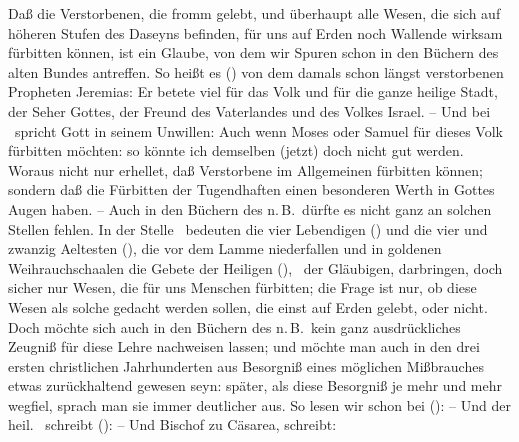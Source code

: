 \begin{aufza}
\item Daß die Verstorbenen, die fromm gelebt, und überhaupt alle Wesen, die sich auf höheren Stufen des Daseyns befinden, für uns auf Erden noch Wallende wirksam fürbitten können, ist ein Glaube, von dem wir Spuren schon in den Büchern des alten Bundes antreffen. So heißt es () von dem damals schon längst verstorbenen Propheten Jeremias: Er betete viel für das Volk und für die ganze heilige Stadt, der Seher Gottes, der Freund des Vaterlandes und des Volkes Israel. -- Und bei \ spricht Gott in seinem Unwillen: Auch wenn Moses oder Samuel für dieses Volk fürbitten möchten: so könnte ich demselben (jetzt) doch nicht gut werden. Woraus nicht nur erhellet, daß Verstorbene im Allgemeinen fürbitten können; sondern daß die Fürbitten der Tugendhaften einen besonderen Werth in Gottes Augen haben. -- Auch in den Büchern des n.\,B.\ dürfte es nicht ganz an solchen Stellen fehlen. In der Stelle \ bedeuten die vier Lebendigen () und die vier und zwanzig Aeltesten (), die vor dem Lamme niederfallen und in goldenen Weihrauchschaalen die Gebete der Heiligen (), \dh\ der Gläubigen, darbringen, doch sicher nur Wesen, die für uns Menschen fürbitten; die Frage ist nur, ob diese Wesen als solche gedacht werden sollen, die einst auf Erden gelebt, oder nicht. Doch möchte sich auch in den Büchern des n.\,B.\ kein ganz ausdrückliches Zeugniß für diese Lehre nachweisen lassen; und möchte man auch in den drei ersten christlichen Jahrhunderten aus Besorgniß eines möglichen Mißbrauches etwas zurückhaltend gewesen seyn: später, als diese Besorgniß je mehr und mehr wegfiel, sprach man sie immer deutlicher aus. So lesen wir schon bei  ():  -- Und der heil.\  schreibt ():  -- Und  Bischof zu Cäsarea, schreibt: 

\end{aufza}

